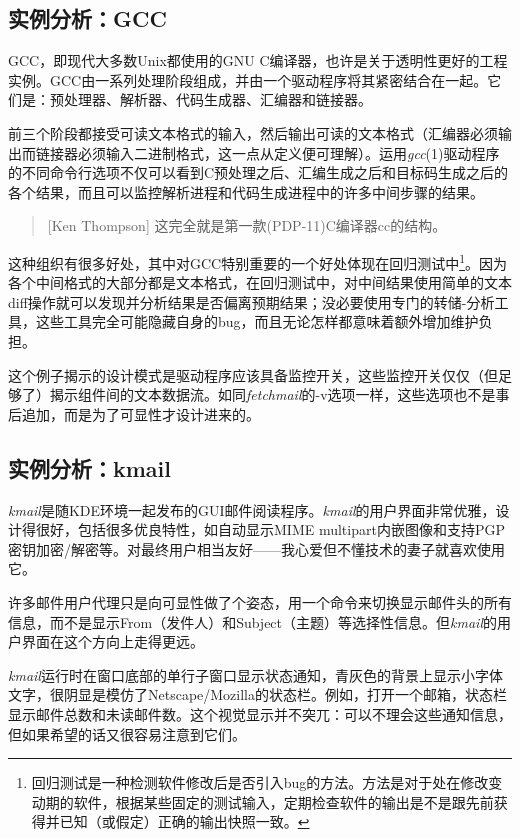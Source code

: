 \documentclass[12pt,oneside]{book}
\begin{document}
\subsection{实例分析：GCC}
GCC，即现代大多数Unix都使用的GNU C编译器，也许是关于透明性更好的工程实例。GCC由一系列处理阶段组成，并由一个驱动程序将其紧密结合在一起。它们是：预处理器、解析器、代码生成器、汇编器和链接器。

前三个阶段都接受可读文本格式的输入，然后输出可读的文本格式（汇编器必须输出而链接器必须输入二进制格式，这一点从定义便可理解）。运用\textit{gcc}(1)驱动程序的不同命令行选项不仅可以看到C预处理之后、汇编生成之后和目标码生成之后的各个结果，而且可以监控解析进程和代码生成进程中的许多中间步骤的结果。
\begin{quote}[Ken Thompson]
这完全就是第一款(PDP-11)C编译器cc的结构。
\end{quote}

这种组织有很多好处，其中对GCC特别重要的一个好处体现在回归测试中\footnote{回归测试是一种检测软件修改后是否引入bug的方法。方法是对于处在修改变动期的软件，根据某些固定的测试输入，定期检查软件的输出是不是跟先前获得并已知（或假定）正确的输出快照一致。}。因为各个中间格式的大部分都是文本格式，在回归测试中，对中间结果使用简单的文本diff操作就可以发现并分析结果是否偏离预期结果；没必要使用专门的转储-分析工具，这些工具完全可能隐藏自身的bug，而且无论怎样都意味着额外增加维护负担。

这个例子揭示的设计模式是驱动程序应该具备监控开关，这些监控开关仅仅（但足够了）揭示组件间的文本数据流。如同\textit{fetchmail}的-v选项一样，这些选项也不是事后追加，而是为了可显性才设计进来的。


\subsection{实例分析：kmail}
\textit{kmail}是随KDE环境一起发布的GUI邮件阅读程序。\textit{kmail}的用户界面非常优雅，设计得很好，包括很多优良特性，如自动显示MIME multipart内嵌图像和支持PGP密钥加密/解密等。对最终用户相当友好——我心爱但不懂技术的妻子就喜欢使用它。

许多邮件用户代理只是向可显性做了个姿态，用一个命令来切换显示邮件头的所有信息，而不是显示From（发件人）和Subject（主题）等选择性信息。但\textit{kmail}的用户界面在这个方向上走得更远。

\textit{kmail}运行时在窗口底部的单行子窗口显示状态通知，青灰色的背景上显示小字体文字，很阴显是模仿了Netscape/Mozilla的状态栏。例如，打开一个邮箱，状态栏显示邮件总数和未读邮件数。这个视觉显示并不突兀：可以不理会这些通知信息，但如果希望的话又很容易注意到它们。
\end{document}

